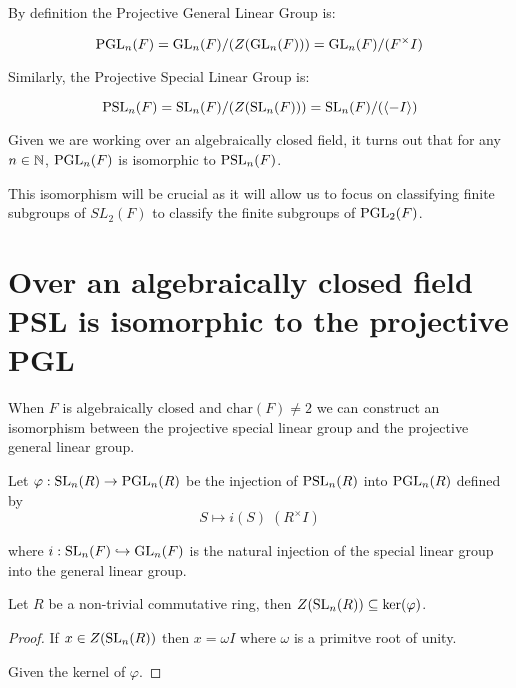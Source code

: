 By definition the Projective General Linear Group is:

\begin{equation}
    \operatorname{PGL}_n(F) = \operatorname{GL}_n(F) / (Z(\operatorname{GL}_n(F))) = \operatorname{GL}_n(F) / (F^\times I) 
\end{equation}

Similarly, the Projective Special Linear Group is:

\begin{equation}
    \operatorname{PSL}_n(F) = \operatorname{SL}_n(F) / (Z(\operatorname{SL}_n(F))) = \operatorname{SL}_n(F) / (\langle -I\rangle)
\end{equation}

Given we are working over an algebraically closed field, it turns out that for any $n \in \mathbb{N}$, $\operatorname{PGL}_n(F)$ is isomorphic to $\operatorname{PSL}_n(F)$.

This isomorphism will be crucial as it will allow us to focus on classifying finite subgroups of $SL_2(F)$ to classify the finite subgroups of $\operatorname{PGL}_2(F)$.

\section{Over an algebraically closed field PSL is isomorphic to the projective PGL}


When $F$ is algebraically closed and $\textrm{char}(F) \neq 2$ we can construct an isomorphism between the projective special linear group and the projective general linear group.
\begin{definition}
\label{SL_monoidHom_PGL}
    Let $\varphi : \operatorname{SL}_n(R) \rightarrow \operatorname{PGL}_n(R)$ be the injection of $\operatorname{PSL}_n(R)$ into $\operatorname{PGL}_n(R)$ defined by
    \[
     S \mapsto i(S) \;  (R^\times I) 
    \]

    where $i : \operatorname{SL}_n(F) \hookrightarrow \operatorname{GL}_n(F)$ is the natural injection of the special linear group into the general linear group.
\end{definition}

\begin{lemma}
\leanok
Let $R$ be a non-trivial commutative ring, then $Z(\operatorname{SL}_n(R)) \subseteq \ker (\varphi)$.
\end{lemma}

\begin{proof}
If $x \in Z(\operatorname{SL}_n(R))$ then $x = \omega I$ where $\omega$ is a primitve root of unity.

Given the kernel of $\varphi$.
\end{proof}



